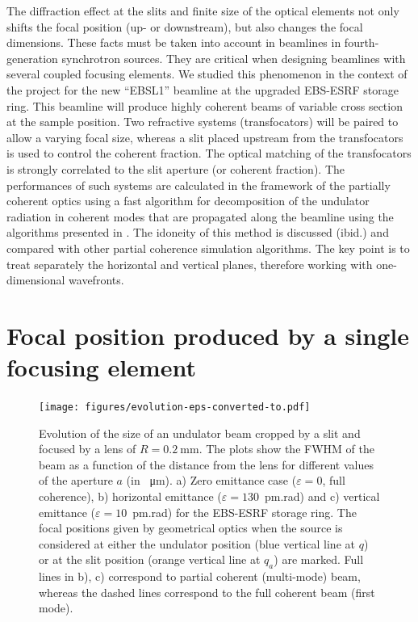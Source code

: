 \documentclass[9pt,twocolumn,twoside]{osajnl}
\begin{document}
The diffraction effect at the slits and finite size of the optical elements not only shifts the focal position (up- or downstream), but also changes the focal dimensions. These facts must be taken into account in beamlines in fourth-generation synchrotron sources. They are critical when designing beamlines with several coupled focusing elements. We studied this phenomenon in the context of the project for the new ``EBSL1'' beamline at the upgraded EBS-ESRF storage ring. This beamline will produce highly coherent beams of variable cross section at the sample position. Two refractive systems (transfocators) will be paired to allow a varying focal size, whereas a slit placed upstream from the transfocators is used to control the coherent fraction. The optical matching of the transfocators is strongly correlated to the slit aperture (or coherent fraction). The performances of such systems are calculated in the framework of the partially coherent optics using a fast algorithm for decomposition of the undulator radiation in coherent modes that are propagated along the beamline using the algorithms presented in \cite{delrio2021pairing}. The idoneity of this method is discussed (ibid.) and compared with other partial coherence simulation algorithms. The key point is to treat separately the horizontal and vertical planes, therefore working with one-dimensional wavefronts.

\section{Focal position produced by a single focusing element}
\label{sec:onelens}

\begin{figure}[t]
\hspace*{-1.0cm}
\centering
\texttt{[image: figures/evolution-eps-converted-to.pdf]}
\caption{Evolution of the size of an undulator beam cropped by a slit and focused by a lens of $R=\SI{0.2}{\milli\meter}$.
The plots show the FWHM of the beam as a function of the distance from the lens for different values of the aperture $a$ (in \SI{}{\micro\meter}). 
a) Zero emittance case ($\varepsilon=0$, full coherence),
b) horizontal emittance ($\varepsilon=130$~pm.rad) and c) vertical emittance ($\varepsilon=10$~pm.rad) for the EBS-ESRF storage ring.
The focal positions given by geometrical optics when the source is considered at either the undulator position (blue vertical line at $q$) or at the slit position (orange vertical line at $q_a$) are marked.
Full lines in b), c) correspond to partial coherent (multi-mode) beam, whereas the dashed lines correspond to the full coherent beam (first mode).
}
\label{fig:oneTFund}
\end{figure}
\end{document}

